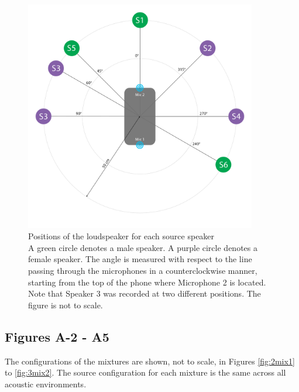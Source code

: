 \begin{figure}[!htb]
    \centering
    \includegraphics[width = 0.9\textwidth]{fig/sourcelocation.png}
    \caption[Positions of the loudspeaker for each source speaker]{Positions of the loudspeaker for each source speaker \\\footnotesize{A green circle denotes a male speaker. A purple circle denotes a female speaker. The angle is measured with respect to the line passing through the microphones in a counterclockwise manner, starting from the top of the phone where Microphone 2 is located. Note that Speaker 3 was recorded at two different positions. The figure is not to scale.}}
    \label{fig:anglesummary}
\end{figure}

\FloatBarrier

\subsection*{Figures A-2 - A5}

The configurations of the mixtures are shown, not to scale, in Figures \ref{fig:2mix1} to \ref{fig:3mix2}. The source configuration for each mixture is the same across all acoustic environments.\newpage

